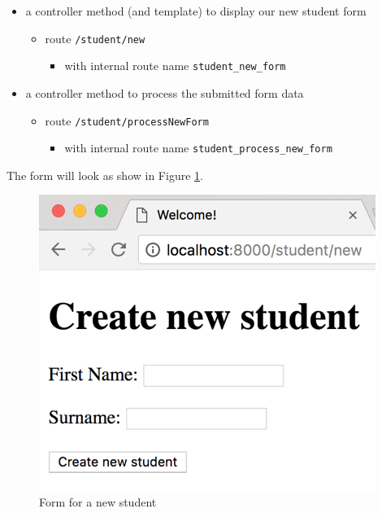 \documentclass[a4paperpaper,openright]{book}
\providecommand{\tightlist}{%
  \setlength{\itemsep}{0pt}\setlength{\parskip}{0pt}}
\begin{document}
\begin{itemize}
\item
  a controller method (and template) to display our new student form

  \begin{itemize}
  \item
    route \texttt{/student/new}

    \begin{itemize}
    \tightlist
    \item
      with internal route name \texttt{student\_new\_form}
    \end{itemize}
  \end{itemize}
\item
  a controller method to process the submitted form data

  \begin{itemize}
  \item
    route \texttt{/student/processNewForm}

    \begin{itemize}
    \tightlist
    \item
      with internal route name \texttt{student\_process\_new\_form}
    \end{itemize}
  \end{itemize}
\end{itemize}

The form will look as show in Figure \ref{new_student_form}.

\begin{figure}
\centering
\includegraphics{./tex2pdf.-d01fd108a306454d/47fb9483958661b9823335391996ce0741d76a07.png}
\caption{Form for a new student \label{new_student_form}}
\end{figure}
\end{document}
